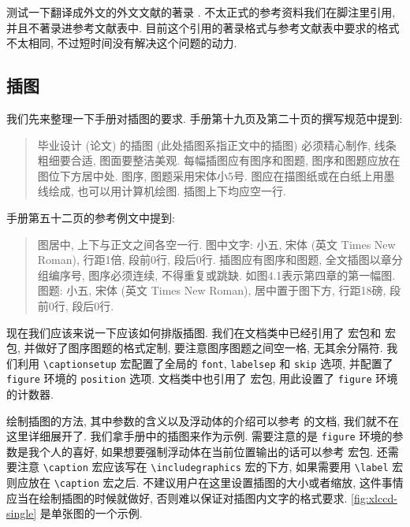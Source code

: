 测试一下翻译成外文的外文文献的著录 \cite{sally_history_1985}. 不太正式的参考资料我们在脚注里引用, 并且不著录进参考文献表中. 目前这个引用的著录格式与参考文献表中要求的格式不太相同, 不过短时间没有解决这个问题的动力.

\subsection{插图}

我们先来整理一下手册对插图的要求. 手册第十九页及第二十页的撰写规范中提到:
\begin{quote}
  毕业设计 (论文) 的插图 (此处插图系指正文中的插图) 必须精心制作, 线条粗细要合适, 图面要整洁美观. 每幅插图应有图序和图题, 图序和图题应放在图位下方居中处. 图序, 图题采用宋体小5号. 图应在描图纸或在白纸上用墨线绘成, 也可以用计算机绘图. 插图上下均应空一行.
\end{quote}
手册第五十二页的参考例文中提到:
\begin{quote}
  图居中, 上下与正文之间各空一行.
  图中文字: 小五, 宋体 (英文 Times New Roman), 行距1倍, 段前0行, 段后0行.
  插图应有图序和图题, 全文插图以章分组编序号, 图序必须连续, 不得重复或跳缺. 如图4.1表示第四章的第一幅图.
  图题: 小五, 宋体 (英文 Times New Roman), 居中置于图下方, 行距18磅, 段前0行, 段后0行.
\end{quote}

现在我们应该来说一下应该如何排版插图. 我们在文档类中已经引用了  宏包\footnotemark 和  宏包, 并做好了图序图题的格式定制, 要注意图序图题之间空一格, 无其余分隔符. 我们利用 \verb|\captionsetup| 宏配置了全局的 \verb|font|, \verb|labelsep| 和 \verb|skip| 选项, 并配置了 \verb|figure| 环境的 \verb|position| 选项. 文档类中也引用了  宏包, 用此设置了 \verb|figure| 环境的计数器.

绘制插图的方法, 其中参数的含义以及浮动体的介绍可以参考  的文档, 我们就不在这里详细展开了. 我们拿手册中的插图来作为示例. 需要注意的是 \verb|figure| 环境的参数是我个人的喜好, 如果想要强制浮动体在当前位置输出的话可以参考  宏包. 还需要注意 \verb|\caption| 宏应该写在 \verb|\includegraphics| 宏的下方, 如果需要用 \verb|\label| 宏则应放在 \verb|\caption| 宏之后. 不建议用户在这里设置插图的大小或者缩放, 这件事情应当在绘制插图的时候就做好, 否则难以保证对插图内文字的格式要求. \ref{fig:xlccd-single} 是单张图的一个示例.

